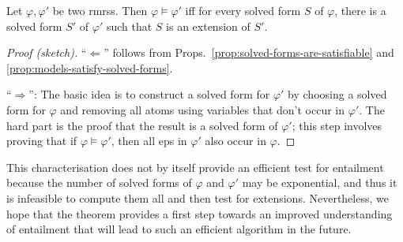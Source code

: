 \begin{thm}\label{thm:big-one}
  Let $\varphi, \varphi'$ be two {\sc rmrs}s.  Then $\varphi \models
  \varphi'$ iff for every solved form $S$ of $\varphi$, there is a
  solved form $S'$ of $\varphi'$ such that $S$ is an extension of
  $S'$. 
\end{thm}
\begin{proof}[Proof (sketch)]
``$\Leftarrow$'' follows from
Props.~\ref{prop:solved-forms-are-satisfiable} and
\ref{prop:models-satisfy-solved-forms}.

``$\Rightarrow$'': The basic idea is to construct a solved form for
$\varphi'$ by choosing a solved form for $\varphi$ and removing all
atoms using variables that don't occur in $\varphi'$.  The hard part
is the proof that the result is a solved form of $\varphi'$; this step
involves proving that if $\varphi \models \varphi'$, then all {\sc ep}s in
$\varphi'$ also occur in $\varphi$.  
\end{proof}

This characterisation does not by itself provide an efficient test for
entailment because the number of solved forms of $\varphi$ and
$\varphi'$ may be exponential, and thus it is infeasible to compute
them all and then test for extensions.  Nevertheless, we hope that the
theorem provides a first step towards an improved understanding of
entailment that will lead to such an efficient algorithm in the
future.


